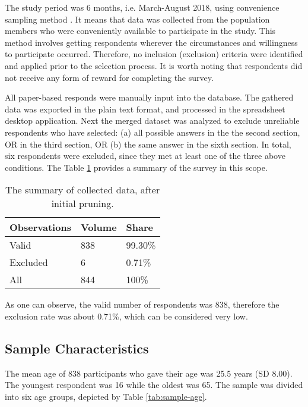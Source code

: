 \documentclass[preprint,12pt]{elsarticle}
\begin{document}
The study period was 6 months, i.e. March-August 2018, using convenience sampling method \cite{emerson2015convenience}. 
It means that data was collected from the population members who were conveniently available to participate in the study. This method involves getting respondents wherever the circumstances and willingness to participate occurred. Therefore, no inclusion (exclusion) criteria were identified and applied prior to the selection process. It is worth noting that respondents did not receive any form of reward for completing the survey.

All paper-based responds were manually input into the database. The gathered data was exported in the plain text format, and processed in the spreadsheet desktop application.
Next the merged dataset was analyzed to exclude unreliable respondents who have selected: (a) all possible answers in the the second section, OR in the third section, OR (b) the same answer in the sixth section. In total, six respondents were excluded, since they met at least one of the three above conditions. The Table \ref{tab:survey-summary} provides a summary of the survey in this scope.

\begin{table}[h]
\centering
\small
\begin{tabular}{|l|l|l|}
\hline
\textbf{Observations} & \textbf{Volume}   & \textbf{Share}     \\ \hline
Valid        & 838 & 99.30\% \\ \hline
Excluded     & 6   & 0.71\%  \\ \hline
All          & 844 & 100\% \\ \hline
\end{tabular}
\caption{\label{tab:survey-summary}The summary of collected data, after initial pruning.}
\end{table}

As one can observe, the valid number of respondents was 838, therefore the exclusion rate was about 0.71\%, which can be considered very low.

\subsection{Sample Characteristics}
The mean age of 838 participants who gave their age was 25.5 years (SD 8.00). The youngest respondent was 16 while the oldest was 65. The sample was divided into six age groups, depicted by Table \ref{tab:sample-age}.
\end{document}
